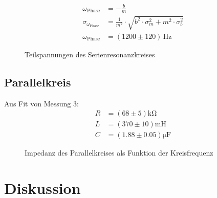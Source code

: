 \documentclass[12pt,a4paper,titlepage,headinclude,bibtotoc]{scrartcl}
\begin{document}
\begin{align}
\omega_\text{Phase}&=- \frac{b}{m}\\
\sigma_{\omega_\text{Phase}}&=\frac{1}{m^{2}} \cdot \sqrt{b^{2} \cdot \sigma_{m}^{2} + m^{2} \cdot \sigma_{b}^{2}}\\
\omega_\text{Phase}&=(1200 \pm 120)\,\si\hertz
\end{align}
\begin{figure}[!htb]
	\centering
	
	\caption{Teilspannungen des Serienresonanzkreises}
	\label{fig:teilU}
\end{figure}
\subsection{Parallelkreis}
Aus Fit von Messung 3:
\begin{align}
R &= (68\pm 5)\si{\kilo\ohm}\\
L &= (370 \pm 10)\si{\milli\henry}\\
C &= (1.88  \pm 0.05) \si{\micro\farad}
\end{align}
\begin{figure}[!htb]
	\centering
	
	\caption{Impedanz des Parallelkreises als Funktion der Kreisfrequenz}
	\label{fig:messung3}
\end{figure}

\section{Diskussion}
\label{sec:diskussion}



\end{document}
